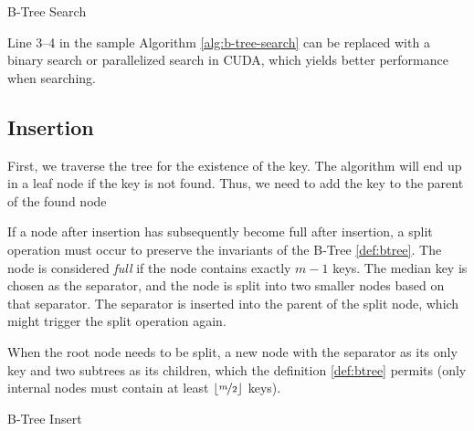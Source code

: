 \begin{algorithm}
  \caption{B-Tree Search}\label{alg:b-tree-search}
  \DontPrintSemicolon


\end{algorithm}

Line 3--4 in the sample Algorithm \ref{alg:b-tree-search} can be replaced with a binary search or parallelized search in CUDA, which yields better performance when searching.

\subsection{Insertion}

First, we traverse the tree for the existence of the key. The algorithm will end up in a leaf node if the key is not found. Thus, we need to add the key to the parent of the found node

If a node after insertion has subsequently become full after insertion, a split operation must occur to preserve the invariants of the B-Tree \ref{def:btree}. The node is considered \textit{full} if the node contains exactly $m - 1$ keys. The median key is chosen as the separator, and the node is split into two smaller nodes based on that separator. The separator is inserted into the parent of the split node, which might trigger the split operation again.

When the root node needs to be split, a new node with the separator as its only key and two subtrees as its children, which the definition \ref{def:btree} permits (only internal nodes must contain at least $\lfloor\nicefrac{m}{2}\rfloor$ keys).

\begin{algorithm}
  \caption{B-Tree Insert}\label{alg:b-tree-insert}
\end{algorithm}


